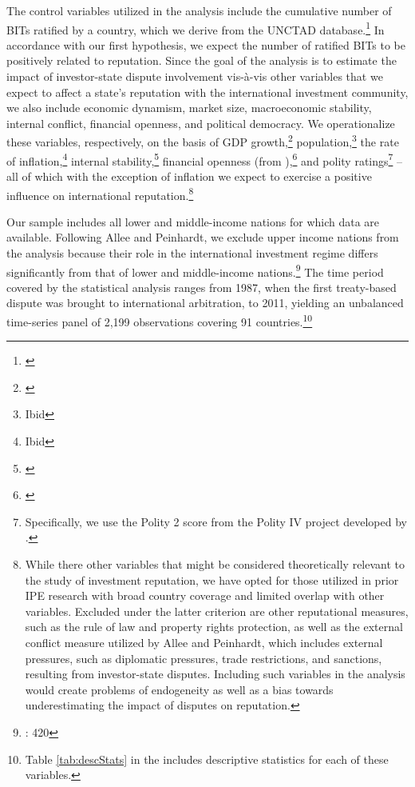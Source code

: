 \documentclass[12pt,onesided]{amsart}
\begin{document}
The control variables utilized in the analysis include the cumulative number of BITs ratified by a country, which we derive from the UNCTAD database.\footnote{\citet{unctad:2013c}} In accordance with our first hypothesis, we expect the number of ratified BITs to be positively related to reputation. Since the goal of the analysis is to estimate the impact of investor-state dispute involvement vis-\`{a}-vis other variables that we expect to affect a state's reputation with the international investment community, we also include economic dynamism, market size, macroeconomic stability, internal conflict, financial openness, and political democracy. We operationalize these variables, respectively, on the basis of GDP growth,\footnote{\citet{worldbank:2013}} population,\footnote{Ibid} the rate of inflation,\footnote{Ibid} internal stability,\footnote{\citet{prs:2013}} financial openness (from \citeauthor{chinn:ito:2008}),\footnote{\citet{chinn:ito:2008}} and polity ratings\footnote{Specifically, we use the Polity 2 score from the Polity IV project developed by \citet{marshall2013polity}.} -- all of which with the exception of inflation we expect to exercise a positive influence on international reputation.\footnote{While there other variables that might be considered theoretically relevant to the study of investment reputation, we have opted for those utilized in prior IPE research with broad country coverage and limited overlap with other variables. Excluded under the latter criterion are other reputational measures, such as the rule of law and property rights protection, as well as the external conflict measure utilized by Allee and Peinhardt, which includes external pressures, such as diplomatic pressures, trade restrictions, and sanctions, resulting from investor-state disputes. Including such variables in the analysis would create problems of endogeneity as well as a bias towards underestimating the impact of disputes on reputation.}

Our sample includes all lower and middle-income nations for which data are available. Following Allee and Peinhardt, we exclude upper income nations from the analysis because their role in the international investment regime differs significantly from that of lower and middle-income nations.\footnote{\citet{allee:peinhardt:2011}: 420} The time period covered by the statistical analysis ranges from 1987, when the first treaty-based dispute was brought to international arbitration, to 2011, yielding an unbalanced time-series panel of 2,199 observations covering 91 countries.\footnote{Table \ref{tab:descStats} in the  includes descriptive statistics for each of these variables.} 
\end{document}
